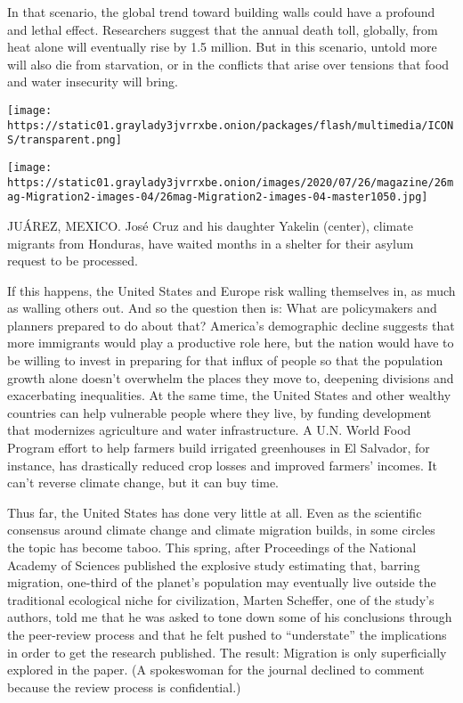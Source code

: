 In that scenario, the global trend toward building walls could have a
profound and lethal effect. Researchers suggest that the annual death
toll, globally, from heat alone will eventually rise by 1.5 million. But
in this scenario, untold more will also die from starvation, or in the
conflicts that arise over tensions that food and water insecurity will
bring.

\texttt{[image: https://static01.graylady3jvrrxbe.onion/packages/flash/multimedia/ICONS/transparent.png]}

\texttt{[image: https://static01.graylady3jvrrxbe.onion/images/2020/07/26/magazine/26mag-Migration2-images-04/26mag-Migration2-images-04-master1050.jpg]}

JUÁREZ, MEXICO. José Cruz and his daughter Yakelin (center), climate
migrants from Honduras, have waited months in a shelter for their asylum
request to be processed.

If this happens, the United States and Europe risk walling themselves
in, as much as walling others out. And so the question then is: What are
policymakers and planners prepared to do about that? America's
demographic decline suggests that more immigrants would play a
productive role here, but the nation would have to be willing to invest
in preparing for that influx of people so that the population growth
alone doesn't overwhelm the places they move to, deepening divisions and
exacerbating inequalities. At the same time, the United States and other
wealthy countries can help vulnerable people where they live, by funding
development that modernizes agriculture and water infrastructure. A U.N.
World Food Program effort to help farmers build irrigated greenhouses in
El Salvador, for instance, has drastically reduced crop losses and
improved farmers' incomes. It can't reverse climate change, but it can
buy time.

Thus far, the United States has done very little at all. Even as the
scientific consensus around climate change and climate migration builds,
in some circles the topic has become taboo. This spring, after
Proceedings of the National Academy of Sciences published the explosive
study estimating that, barring migration, one-third of the planet's
population may eventually live outside the traditional ecological niche
for civilization, Marten Scheffer, one of the study's authors, told me
that he was asked to tone down some of his conclusions through the
peer-review process and that he felt pushed to ``understate'' the
implications in order to get the research published. The result:
Migration is only superficially explored in the paper. (A spokeswoman
for the journal declined to comment because the review process is
confidential.)

